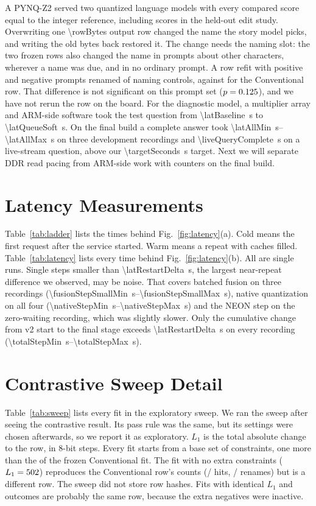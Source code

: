 \documentclass[conference,10pt,letterpaper]{IEEEtran}
\newcommand{\seconds}[1]{\SI{#1}{\second}}
\newcommand{\secrange}[2]{\SIrange{#1}{#2}{\second}}
\newcommand{\pynq}{\mbox{PYNQ-Z2}}
\begin{document}
A \pynq{} served two quantized language models with every compared score equal to the integer reference, including \lmBoardScores{} scores in the held-out edit study. Overwriting one \SI{\rowBytes}{\byte} output row changed the name the story model picks, and writing the old bytes back restored it. The change needs the naming slot: the two frozen rows also changed the name in prompts about other characters, wherever a name was due, and in no ordinary prompt. A row refit with \positiveAuthoring{} positive and \negativeAuthoring{} negative prompts renamed \contrastiveLeaks{} of \extNaming{} naming controls, against \conventionalLeaks{} for the Conventional row. That difference is not significant on this prompt set ($p=0.125$), and we have not rerun the row on the board. For the diagnostic model, a multiplier array and ARM-side software took the test question from \seconds{\latBaseline} to \seconds{\latQueueSoft}. On the final build a complete answer took \secrange{\latAllMin}{\latAllMax} on three development recordings and \seconds{\liveQueryComplete} on a live-stream question, above our \seconds{\targetSeconds} target. Next we will separate DDR read pacing from ARM-side work with counters on the final build.

\appendices

\section{Latency Measurements}
\label{app:latency}
Table~\ref{tab:ladder} lists the times behind Fig.~\ref{fig:latency}(a). Cold means the first request after the service started. Warm means a repeat with caches filled. Table~\ref{tab:latency} lists every time behind Fig.~\ref{fig:latency}(b). All are single runs. Single steps smaller than \seconds{\latRestartDelta}, the largest near-repeat difference we observed, may be noise. That covers batched fusion on three recordings (\secrange{\fusionStepSmallMin}{\fusionStepSmallMax}), native quantization on all four (\secrange{\nativeStepMin}{\nativeStepMax}) and the NEON step on the zero-waiting recording, which was slightly slower. Only the cumulative change from v2 start to the final stage exceeds \seconds{\latRestartDelta} on every recording (\secrange{\totalStepMin}{\totalStepMax}).

\section{Contrastive Sweep Detail}
\label{app:sweep}
Table~\ref{tab:sweep} lists every fit in the exploratory sweep. We ran the sweep after seeing the contrastive result. Its pass rule was the same, but its settings were chosen afterwards, so we report it as exploratory. $L_1$ is the total absolute change to the row, in 8-bit steps. Every fit starts from a base set of \sweepBaseConstraints{} constraints, one more than the \fitConstraints{} of the frozen Conventional fit. The fit with no extra constraints ($L_1=502$) reproduces the Conventional row's counts (\sweepBaseHits/\extTargets{} hits, \sweepBaseLeaks/\extNaming{} renames) but is a different row. The sweep did not store row hashes. Fits with identical $L_1$ and outcomes are probably the same row, because the extra negatives were inactive.
\end{document}
